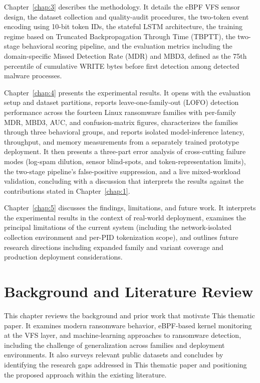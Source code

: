 Chapter~\ref{chap:3} describes the methodology. It details the eBPF VFS sensor design, the dataset collection and quality-audit procedures, the two-token event encoding using 10-bit token IDs, the stateful \textmu{}LSTM architecture, the training regime based on Truncated Backpropagation Through Time (TBPTT), the two-stage behavioral scoring pipeline, and the evaluation metrics including the domain-specific Missed Detection Rate (MDR) and MBD3, defined as the 75th percentile of cumulative WRITE bytes before first detection among detected malware processes.

Chapter~\ref{chap:4} presents the experimental results. It opens with the evaluation setup and dataset partitions, reports leave-one-family-out (LOFO) detection performance across the fourteen Linux ransomware families with per-family MDR, MBD3, AUC, and confusion-matrix figures, characterizes the families through three behavioral groups, and reports isolated model-inference latency, throughput, and memory measurements from a separately trained prototype deployment. It then presents a three-part error analysis of cross-cutting failure modes (log-spam dilution, sensor blind-spots, and token-representation limits), the two-stage pipeline's false-positive suppression, and a live mixed-workload validation, concluding with a discussion that interprets the results against the contributions stated in Chapter~\ref{chap:1}.

Chapter~\ref{chap:5} discusses the findings, limitations, and future work. It interprets the experimental results in the context of real-world deployment, examines the principal limitations of the current system (including the network-isolated collection environment and per-PID tokenization scope), and outlines future research directions including expanded family and variant coverage and production deployment considerations.

\chapter{Background and Literature Review}\label{chap:2}

This chapter reviews the background and prior work that motivate This thematic paper. It examines modern ransomware behavior, eBPF-based kernel monitoring at the VFS layer, and machine-learning approaches to ransomware detection, including the challenge of generalization across families and deployment environments. It also surveys relevant public datasets and concludes by identifying the research gaps addressed in This thematic paper and positioning the proposed approach within the existing literature.

